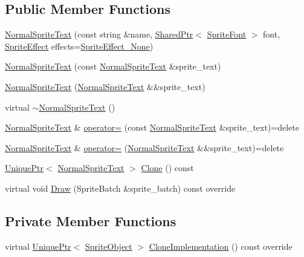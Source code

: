 \subsection*{Public Member Functions}
\begin{DoxyCompactItemize}
\item 
\hyperlink{classmage_1_1_normal_sprite_text_af91e5d22a02044c4159eefdc161c5dec}{Normal\+Sprite\+Text} (const string \&name, \hyperlink{namespacemage_a1e01ae66713838a7a67d30e44c67703e}{Shared\+Ptr}$<$ \hyperlink{classmage_1_1_sprite_font}{Sprite\+Font} $>$ font, \hyperlink{namespacemage_a9cfe18123066ba4236f548f9de75d881}{Sprite\+Effect} effects=\hyperlink{namespacemage_a9cfe18123066ba4236f548f9de75d881af3c275fbfacfe174da928b2f24dfa515}{Sprite\+Effect\+\_\+\+None})
\item 
\hyperlink{classmage_1_1_normal_sprite_text_aa73a83a29b28d7b5f20240f3074e5d4d}{Normal\+Sprite\+Text} (const \hyperlink{classmage_1_1_normal_sprite_text}{Normal\+Sprite\+Text} \&sprite\+\_\+text)
\item 
\hyperlink{classmage_1_1_normal_sprite_text_ab2b8232a1bb1aa5294eaa335cb0ccd97}{Normal\+Sprite\+Text} (\hyperlink{classmage_1_1_normal_sprite_text}{Normal\+Sprite\+Text} \&\&sprite\+\_\+text)
\item 
virtual \hyperlink{classmage_1_1_normal_sprite_text_ae8575ab8ece5b8b923509fc7ab4d3dea}{$\sim$\+Normal\+Sprite\+Text} ()
\item 
\hyperlink{classmage_1_1_normal_sprite_text}{Normal\+Sprite\+Text} \& \hyperlink{classmage_1_1_normal_sprite_text_ab7dbd2e71dcaef5d6b7b767afa8d7094}{operator=} (const \hyperlink{classmage_1_1_normal_sprite_text}{Normal\+Sprite\+Text} \&sprite\+\_\+text)=delete
\item 
\hyperlink{classmage_1_1_normal_sprite_text}{Normal\+Sprite\+Text} \& \hyperlink{classmage_1_1_normal_sprite_text_a54cb023fad3b66dba35854ceaa50bc44}{operator=} (\hyperlink{classmage_1_1_normal_sprite_text}{Normal\+Sprite\+Text} \&\&sprite\+\_\+text)=delete
\item 
\hyperlink{namespacemage_a8c307fbcc33bce9b7f2aa4c26c3b95cf}{Unique\+Ptr}$<$ \hyperlink{classmage_1_1_normal_sprite_text}{Normal\+Sprite\+Text} $>$ \hyperlink{classmage_1_1_normal_sprite_text_a8357ea517cff639204da4825024d9d34}{Clone} () const
\item 
virtual void \hyperlink{classmage_1_1_normal_sprite_text_ad2a1b02bea18afd6bf61b106a727a355}{Draw} (Sprite\+Batch \&sprite\+\_\+batch) const override
\end{DoxyCompactItemize}
\subsection*{Private Member Functions}
\begin{DoxyCompactItemize}
\item 
virtual \hyperlink{namespacemage_a8c307fbcc33bce9b7f2aa4c26c3b95cf}{Unique\+Ptr}$<$ \hyperlink{classmage_1_1_sprite_object}{Sprite\+Object} $>$ \hyperlink{classmage_1_1_normal_sprite_text_a261996eafdc02f39c6c57eb2b7ec2cea}{Clone\+Implementation} () const override
\end{DoxyCompactItemize}
